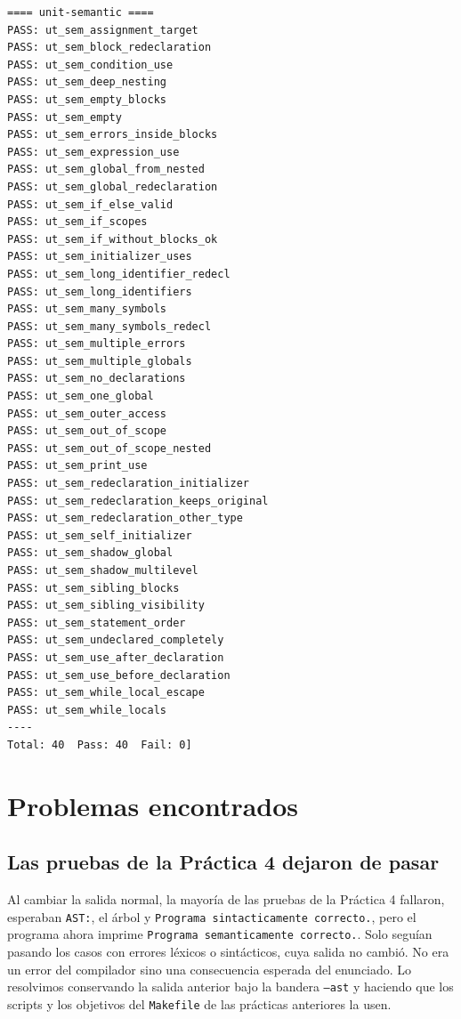 \documentclass[12pt,letterpaper]{article}
\begin{document}
\begin{verbatim}
==== unit-semantic ====
PASS: ut_sem_assignment_target
PASS: ut_sem_block_redeclaration
PASS: ut_sem_condition_use
PASS: ut_sem_deep_nesting
PASS: ut_sem_empty_blocks
PASS: ut_sem_empty
PASS: ut_sem_errors_inside_blocks
PASS: ut_sem_expression_use
PASS: ut_sem_global_from_nested
PASS: ut_sem_global_redeclaration
PASS: ut_sem_if_else_valid
PASS: ut_sem_if_scopes
PASS: ut_sem_if_without_blocks_ok
PASS: ut_sem_initializer_uses
PASS: ut_sem_long_identifier_redecl
PASS: ut_sem_long_identifiers
PASS: ut_sem_many_symbols
PASS: ut_sem_many_symbols_redecl
PASS: ut_sem_multiple_errors
PASS: ut_sem_multiple_globals
PASS: ut_sem_no_declarations
PASS: ut_sem_one_global
PASS: ut_sem_outer_access
PASS: ut_sem_out_of_scope
PASS: ut_sem_out_of_scope_nested
PASS: ut_sem_print_use
PASS: ut_sem_redeclaration_initializer
PASS: ut_sem_redeclaration_keeps_original
PASS: ut_sem_redeclaration_other_type
PASS: ut_sem_self_initializer
PASS: ut_sem_shadow_global
PASS: ut_sem_shadow_multilevel
PASS: ut_sem_sibling_blocks
PASS: ut_sem_sibling_visibility
PASS: ut_sem_statement_order
PASS: ut_sem_undeclared_completely
PASS: ut_sem_use_after_declaration
PASS: ut_sem_use_before_declaration
PASS: ut_sem_while_local_escape
PASS: ut_sem_while_locals
----
Total: 40  Pass: 40  Fail: 0]
\end{verbatim}

\section*{Problemas encontrados}\label{sec:problemas}

\subsection*{Las pruebas de la Práctica 4 dejaron de pasar}

Al cambiar la salida normal, la mayoría de las pruebas de la Práctica 4 fallaron, esperaban \texttt{AST:}, el
árbol y \texttt{Programa sintacticamente correcto.}, pero el programa ahora imprime
\texttt{Programa semanticamente correcto.}. Solo seguían pasando los casos con errores léxicos o sintácticos,
cuya salida no cambió. No era un error del compilador sino una consecuencia esperada del enunciado.
Lo resolvimos conservando la salida anterior bajo la bandera \texttt{--ast} y haciendo que los scripts y los
objetivos del \texttt{Makefile} de las prácticas anteriores la usen.
\end{document}
